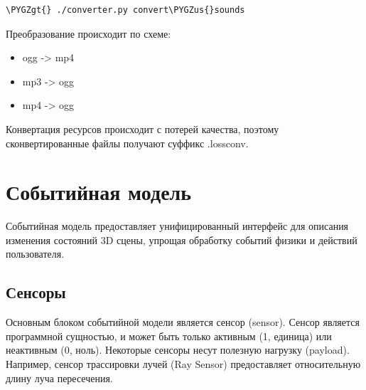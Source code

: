 \documentclass[a4paper,12pt,oneside]{sphinxmanual}
\def\PYGZus{\char`\_}
\def\PYGZgt{\char`\>}
\begin{document}
\begin{Verbatim}[commandchars=\\\{\}]
\PYGZgt{} ./converter.py convert\PYGZus{}sounds
\end{Verbatim}

Преобразование происходит по схеме:
\begin{itemize}
\item {} 
ogg -\textgreater{} mp4

\item {} 
mp3 -\textgreater{} ogg

\item {} 
mp4 -\textgreater{} ogg

\end{itemize}

Конвертация ресурсов происходит с потерей качества, поэтому сконвертированные
файлы получают суффикс .lossconv.


\chapter{Событийная модель}
\label{event_model:id1}\label{event_model::doc}\label{event_model:event-model}
Событийная модель предоставляет унифицированный интерфейс для описания
изменения состояний 3D сцены, упрощая обработку событий физики и действий
пользователя.


\section{Сенсоры}
\label{event_model:id2}\label{event_model:index-0}
Основным блоком событийной модели является сенсор (sensor). Сенсор является
программной сущностью, и может быть только активным (1, единица) или неактивным (0, ноль).
Некоторые сенсоры несут полезную нагрузку (payload). Например, сенсор трассировки лучей (Ray Sensor)
предоставляет относительную длину луча пересечения.
\end{document}
